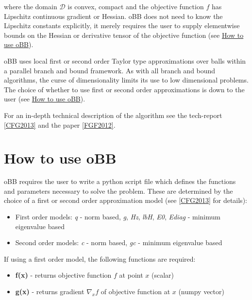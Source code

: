 \documentclass[letterpaper,11pt,openany,oneside]{sphinxmanual}
\begin{document}
where the domain $\mathcal{D}$ is convex, compact and the objective function $f$ has Lipschitz continuous gradient or Hessian. oBB does not need to know the Lipschitz constants explicitly, it merely requires the user to supply elementwise bounds on the Hessian or derivative tensor of the objective function (see {\hyperref[userguide:how-to-use-obb]{How to use oBB}}).

oBB uses local first or second order Taylor type approximations over balls within a parallel branch and bound framework. As with all branch and bound algorithms, the curse of dimensionality limits its use to low dimensional problems. The choice of whether to use first or second order approximations is down to the user  (see {\hyperref[userguide:how-to-use-obb]{How to use oBB}}).

For an in-depth technical description of the algorithm see the tech-report {\hyperref[userguide:cfg2013]{{[}CFG2013{]}}} and the paper {\hyperref[userguide:fgf2012]{{[}FGF2012{]}}}.


\section{How to use oBB}
\label{userguide:how-to-use-obb}
oBB requires the user to write a python script file which defines the functions and parameters necessary to solve the problem. These are determined by the choice of a first or second order approximation model (see {\hyperref[userguide:cfg2013]{{[}CFG2013{]}}} for details):
\begin{itemize}
\item {} 
First order models: \emph{q} - norm based,  \emph{g}, \emph{Hz}, \emph{lbH}, \emph{E0}, \emph{Ediag} - minimum eigenvalue based

\item {} 
Second order models: \emph{c} - norm based, \emph{gc} - minimum eigenvalue based

\end{itemize}

If using a first order model, the following functions are required:
\begin{itemize}
\item {} 
\textbf{f(x)} - returns objective function $f$ at point $x$ (scalar)

\item {} 
\textbf{g(x)} - returns gradient $\nabla_x f$ of objective function at $x$ (numpy vector)

\end{itemize}
\end{document}
